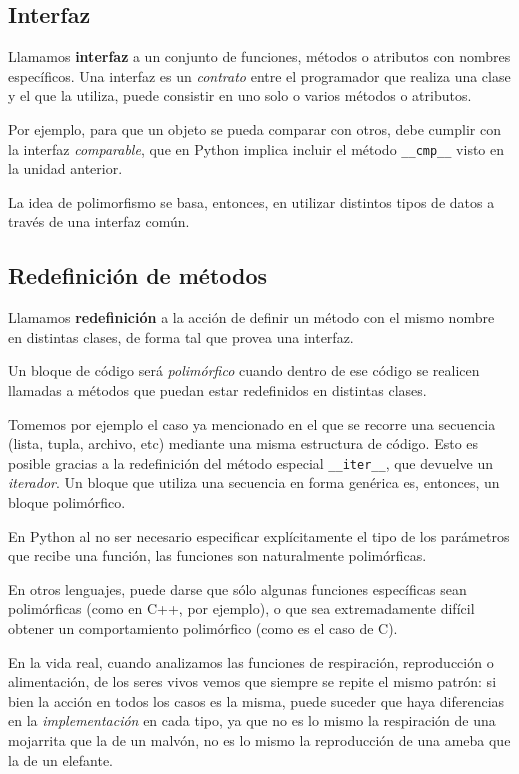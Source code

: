 \subsection{Interfaz}

Llamamos {\bf interfaz} a un conjunto de funciones, métodos o atributos con
nombres específicos.  Una interfaz es un {\it contrato} entre el
programador que realiza una clase y el que la utiliza, puede consistir en
uno solo o varios métodos o atributos.

Por ejemplo, para que un objeto se pueda comparar con otros, debe cumplir
con la interfaz {\it comparable}, que en Python implica incluir el método
\lstinline!__cmp__! visto en la unidad anterior.

La idea de polimorfismo se basa, entonces, en utilizar distintos tipos de
datos a través de una interfaz común.

\subsection{Redefinición de métodos}

Llamamos {\bf redefinición} a la acción de definir un método con el mismo
nombre en distintas clases, de forma tal que provea una interfaz.

Un bloque de código será {\it polimórfico} cuando dentro de ese código se
realicen llamadas a métodos que puedan estar redefinidos en distintas
clases.

Tomemos por ejemplo el caso ya mencionado en el que se recorre una
secuencia (lista, tupla, archivo, etc) mediante una misma estructura de
código.  Esto es posible gracias a la redefinición del método especial
\lstinline!__iter__!, que devuelve un {\it iterador}.  Un bloque que
utiliza una secuencia en forma genérica es, entonces, un bloque
polimórfico.

\begin{sabias_que}
En Python al no ser necesario especificar explícitamente el tipo de los
parámetros que recibe una función, las funciones son naturalmente
polimórficas.

En otros lenguajes, puede darse que sólo algunas funciones específicas sean
polimórficas (como en C++, por ejemplo), o que sea extremadamente difícil
obtener un comportamiento polimórfico (como es el caso de C).
\end{sabias_que}

En la vida real, cuando analizamos las funciones de respiración,
reproducción o alimentación, de los seres vivos vemos que siempre se repite
el mismo patrón: si bien la acción en todos los casos es la misma, puede
suceder que haya diferencias en la {\it implementación} en cada tipo, ya
que no es lo mismo la respiración de una mojarrita que la de un malvón, no
es lo mismo la reproducción de una ameba que la de un elefante.

